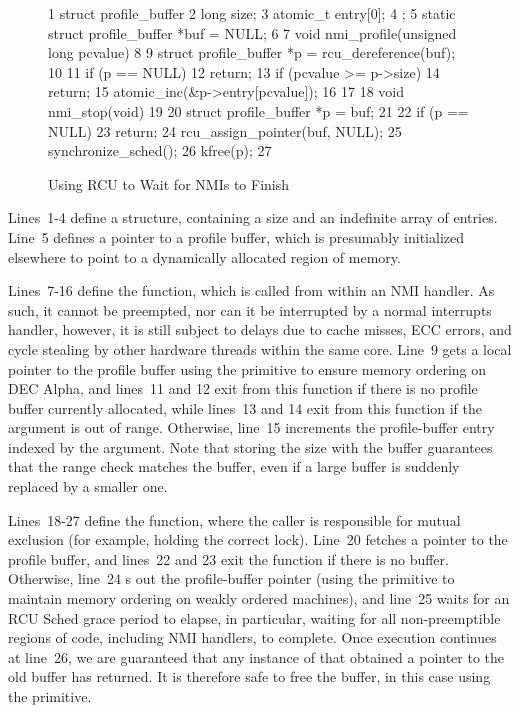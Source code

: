 \begin{figure}[tbp]
{ \scriptsize
\begin{verbbox}
  1 struct profile_buffer {
  2   long size;
  3   atomic_t entry[0];
  4 };
  5 static struct profile_buffer *buf = NULL;
  6
  7 void nmi_profile(unsigned long pcvalue)
  8 {
  9   struct profile_buffer *p = rcu_dereference(buf);
 10
 11   if (p == NULL)
 12     return;
 13   if (pcvalue >= p->size)
 14     return;
 15   atomic_inc(&p->entry[pcvalue]);
 16 }
 17
 18 void nmi_stop(void)
 19 {
 20   struct profile_buffer *p = buf;
 21
 22   if (p == NULL)
 23     return;
 24   rcu_assign_pointer(buf, NULL);
 25   synchronize_sched();
 26   kfree(p);
 27 }
\end{verbbox}
}
\centering
\theverbbox
\caption{Using RCU to Wait for NMIs to Finish}
\label{fig:defer:Using RCU to Wait for NMIs to Finish}
\end{figure}

Lines~1-4 define a  structure, containing a
size and an indefinite array of entries.
Line~5 defines a pointer to a profile buffer, which is
presumably initialized elsewhere to point to a dynamically allocated
region of memory.

Lines~7-16 define the  function,
which is called from within an NMI handler.
As such, it cannot be preempted, nor can it be interrupted by a normal
interrupts handler, however, it is still subject to delays due to cache misses,
ECC errors, and cycle stealing by other hardware threads within the same
core.
Line~9 gets a local pointer to the profile buffer using the
 primitive to ensure memory ordering on
DEC Alpha, and
lines~11 and 12 exit from this function if there is no
profile buffer currently allocated, while lines~13 and 14
exit from this function if the  argument
is out of range.
Otherwise, line~15 increments the profile-buffer entry indexed
by the  argument.
Note that storing the size with the buffer guarantees that the
range check matches the buffer, even if a large buffer is suddenly
replaced by a smaller one.

Lines~18-27 define the  function,
where the caller is responsible for mutual exclusion (for example,
holding the correct lock).
Line~20 fetches a pointer to the profile buffer, and
lines~22 and 23 exit the function if there is no buffer.
Otherwise, line~24 s out the profile-buffer pointer
(using the  primitive to maintain
memory ordering on weakly ordered machines),
and line~25 waits for an RCU Sched grace period to elapse,
in particular, waiting for all non-preemptible regions of code,
including NMI handlers, to complete.
Once execution continues at line~26, we are guaranteed that
any instance of  that obtained a
pointer to the old buffer has returned.
It is therefore safe to free the buffer, in this case using the
 primitive.

